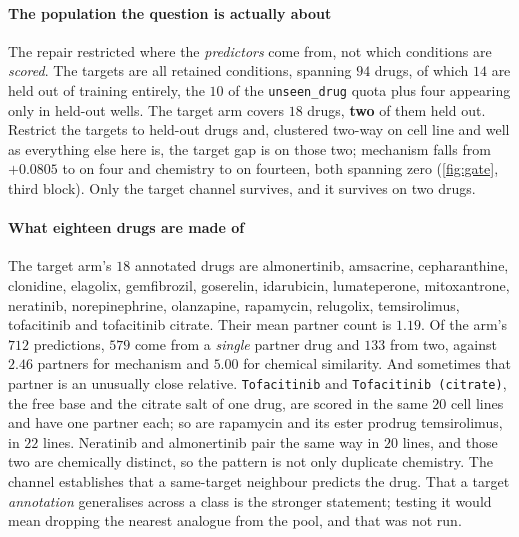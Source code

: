 

\paragraph{The population the question is actually about} The repair restricted
where the \emph{predictors} come from, not which conditions are \emph{scored}.
The targets are all retained conditions, spanning $94$ drugs, of which $14$ are
held out of training entirely, the $10$ of the \texttt{unseen\_drug} quota plus
four appearing only in held-out wells. The target arm covers $18$ drugs,
\textbf{two} of them held out. Restrict the targets to held-out drugs and,
clustered two-way on cell line and well as everything else here is, the target
gap is  on those two; mechanism falls from
$+0.0805$ to  on four and chemistry to
 on fourteen, both spanning zero
(\cref{fig:gate}, third block). Only the target channel survives, and it
survives on two drugs.

\paragraph{What eighteen drugs are made of} The target arm's $18$ annotated drugs
are almonertinib, amsacrine, cepharanthine, clonidine, elagolix, gemfibrozil,
goserelin, idarubicin, lumateperone, mitoxantrone, neratinib, norepinephrine,
olanzapine, rapamycin, relugolix, temsirolimus, tofacitinib and tofacitinib
citrate. Their mean partner count is $1.19$. Of the arm's $712$ predictions,
$579$ come from a \emph{single} partner drug and $133$ from two, against $2.46$
partners for mechanism and $5.00$ for chemical similarity. And sometimes that
partner is an unusually close relative. \texttt{Tofacitinib} and
\texttt{Tofacitinib (citrate)}, the free base and the citrate salt of one drug,
are scored in the same $20$ cell lines and have one partner each; so are
rapamycin and its ester prodrug temsirolimus, in $22$ lines. Neratinib and
almonertinib pair the same way in $20$ lines, and those two are chemically
distinct, so the pattern is not only duplicate chemistry. The channel
establishes that a same-target neighbour predicts the drug. That a target
\emph{annotation} generalises across a class is the stronger statement; testing
it would mean dropping the nearest analogue from the pool, and that was not run.

